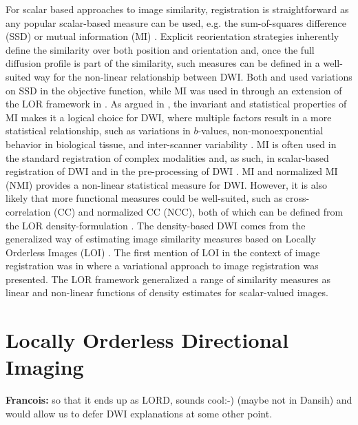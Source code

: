 \documentclass[twocolumn]{svjour3}
\newcommand{\francois}[1]{{\color{red}\textbf{Francois: }#1}}
\newcommand{\francois}[1]{{}}
\begin{document}
For scalar based approaches to image similarity, registration is straightforward as any
popular scalar-based measure can be used, e.g. the sum-of-squares difference (SSD)
\cite{yeo2009dt} or mutual information (MI)
\cite{wells1996mmv,wang2017evaluations}. Explicit reorientation strategies inherently
define the similarity over both position and orientation and, once the full diffusion
profile is part of the similarity, such measures can be defined in a well-suited way for
the non-linear relationship between DWI. Both \cite{zhang2006deformable} and
\cite{yeo2009dt} used variations on SSD in the objective function, while MI was used in
\cite{jensen2015locally} through an extension of the LOR framework in
\cite{darkner2013locally}. As argued in \cite{jensen2015locally}, the invariant and
statistical properties of MI makes it a logical choice for DWI, where multiple factors
result in a more statistical relationship, such as variations in $b$-values,
non-monoexponential behavior in biological tissue, and inter-scanner variability
\cite{johansen2013diffusion}. MI is often used in the standard registration of complex
modalities and, as such, in scalar-based registration of DWI \cite{van2007nonrigid} and in
the pre-processing of DWI \cite{treiber2016characterization}. MI and normalized MI (NMI)
\cite{studholme1999overlap} provides a non-linear statistical measure for DWI. However, it
is also likely that more functional measures could be well-suited, such as
cross-correlation (CC) and normalized CC (NCC), both of which can be defined from the LOR
density-formulation \cite{sporring2011jacobians,darknersporring2012pami}. The
density-based DWI comes from the generalized way of estimating image similarity measures
based on Locally Orderless Images (LOI) \cite{koenderink1999structure}. The first mention
of LOI in the context of image registration was in \cite{hermosillo2002variational} where
a variational approach to image registration was presented. The LOR framework
\cite{darknersporring2011ipmi,darknersporring2012pami} generalized a range of similarity
measures as linear and non-linear functions of density estimates for scalar-valued images.


\section{Locally Orderless  Directional Imaging}
\francois{so that it ends up as LORD, sounds cool:-) (maybe not in Dansih) and would allow us to defer DWI explanations at some other point.} 
\label{sec:lor_dwi}
\end{document}
